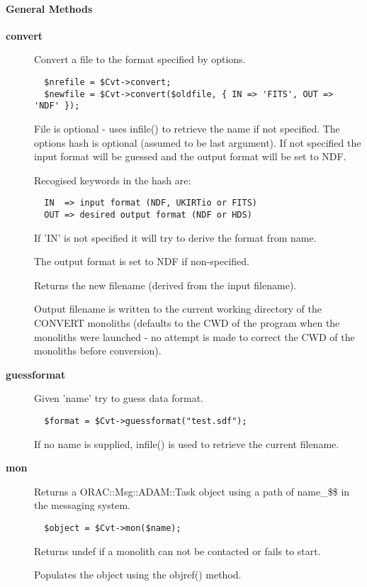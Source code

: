 \paragraph*{General Methods\label{ORAC::Convert_General_Methods}}\begin{description}
\item[\textbf{convert}] \mbox{}

Convert a file to the format specified by options.

\begin{verbatim}
  $nrefile = $Cvt->convert;
  $newfile = $Cvt->convert($oldfile, { IN => 'FITS', OUT => 'NDF' });
\end{verbatim}


File is optional - uses infile() to retrieve the name if not specified.
The options hash is optional (assumed to be last argument). If not
specified the input format will be guessed and the output format
will be set to NDF.



Recogised keywords in the hash are:

\begin{verbatim}
  IN  => input format (NDF, UKIRTio or FITS)
  OUT => desired output format (NDF or HDS)
\end{verbatim}


If 'IN' is not specified it will try to derive the format from
name.



The output format is set to NDF if non-specified.



Returns the new filename (derived from the input filename).



Output filename is written to the current working directory of the
CONVERT monoliths (defaults to the CWD of the program when the
monoliths were launched - no attempt is made to correct the
CWD of the monoliths before conversion).

\item[\textbf{guessformat}] \mbox{}

Given 'name' try to guess data format.

\begin{verbatim}
  $format = $Cvt->guessformat("test.sdf");
\end{verbatim}


If no name is supplied, infile() is used to retrieve the current
filename.

\item[\textbf{mon}] \mbox{}

Returns a ORAC::Msg::ADAM::Task object using a path of name\_\$\$
in the messaging system.

\begin{verbatim}
  $object = $Cvt->mon($name);
\end{verbatim}


Returns undef if a monolith can not be contacted or fails to start.



Populates the object using the objref() method.

\end{description}
